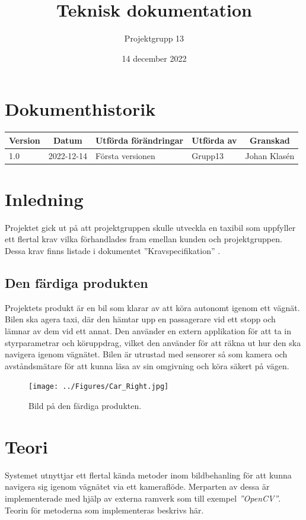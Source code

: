 \documentclass[10pt,oneside,swedish]{lips}
\title{Teknisk dokumentation}
\author{Projektgrupp 13}
\date{14 december 2022}
\begin{document}


\cleardoublepage
\tableofcontents{}

\cleardoublepage
\section*{Dokumenthistorik}
\begin{tabular}{p{}|p{}|p{}|p{}|p{}} 
  \multicolumn{1}{c}{\bfseries Version} & 
  \multicolumn{1}{|c}{\bfseries Datum} & 
  \multicolumn{1}{|c}{\bfseries Utförda förändringar} & 
  \multicolumn{1}{|c}{\bfseries Utförda av} & 
  \multicolumn{1}{|c}{\bfseries Granskad}\\
  \hline
  \hline
  1.0 & 2022-12-14 & Första versionen & Grupp13 & Johan Klasén   \\
  \hline
\end{tabular}

\cleardoublepage
{}\cfoot{\thepage}

\section{Inledning}
Projektet gick ut på att projektgruppen skulle utveckla en taxibil som uppfyller ett flertal krav vilka förhandlades fram emellan kunden och projektgruppen. Dessa krav finns listade i dokumentet ''Kravspecifikation'' \cite{kravspec}.

\subsection{Den färdiga produkten}
Projektets produkt är en bil som klarar av att köra autonomt igenom ett vägnät. Bilen ska agera taxi, där den hämtar upp en passagerare vid ett stopp och lämnar av dem vid ett annat. Den använder en extern applikation för att ta in styrparametrar och köruppdrag, vilket den använder för att räkna ut hur den ska navigera igenom vägnätet. Bilen är utrustad med sensorer så som kamera och avståndsmätare för att kunna läsa av sin omgivning och köra säkert på vägen.

\begin{figure}[H]%
  \centering
  \texttt{[image: ../Figures/Car\_Right.jpg]}
  \caption{Bild på den färdiga produkten.}
  \label{fig:system-overview}
\end{figure}

\pagebreak

\section{Teori}
Systemet utnyttjar ett flertal kända metoder inom bildbehanling för att kunna navigera sig igenom vägnätet via ett kameraflöde. Merparten av dessa är implementerade med hjälp av externa ramverk som till exempel \emph{''OpenCV''}. Teorin för metoderna som implementeras beskrivs här.
\end{document}
